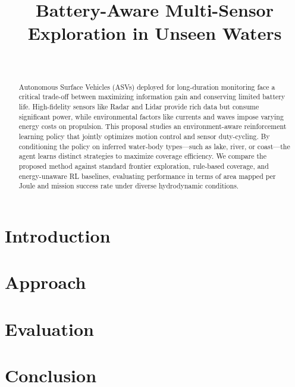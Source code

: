 \documentclass[conference]{IEEEtran}
\title{Battery-Aware Multi-Sensor Exploration in Unseen Waters}
\author{\IEEEauthorblockN{IMSEL Research Group} \\
\IEEEauthorblockA{CSCE 775: Deep Reinforcement Learning}}
\begin{document}
\maketitle

\begin{abstract}
Autonomous Surface Vehicles (ASVs) deployed for long-duration monitoring face a critical trade-off between maximizing information gain and conserving limited battery life. High-fidelity sensors like Radar and Lidar provide rich data but consume significant power, while environmental factors like currents and waves impose varying energy costs on propulsion. This proposal studies an environment-aware reinforcement learning policy that jointly optimizes motion control and sensor duty-cycling. By conditioning the policy on inferred water-body types—such as lake, river, or coast—the agent learns distinct strategies to maximize coverage efficiency. We compare the proposed method against standard frontier exploration, rule-based coverage, and energy-unaware RL baselines, evaluating performance in terms of area mapped per Joule and mission success rate under diverse hydrodynamic conditions.
\end{abstract}


\section{Introduction}


\section{Approach}



\section{Evaluation}


\section{Conclusion}


\nocite{*}


\end{document}
